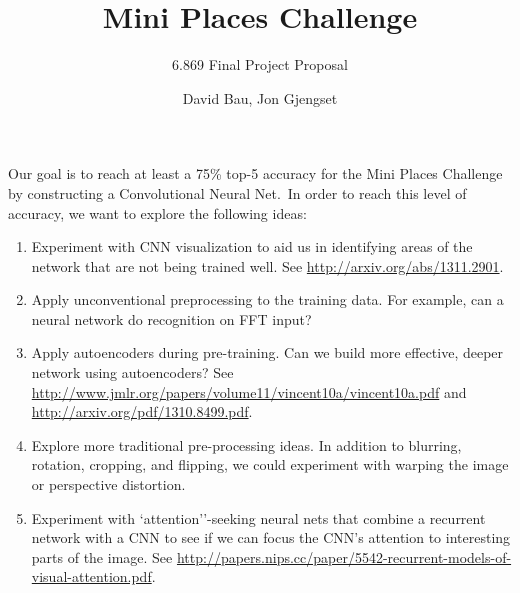 \documentclass[letterpaper]{scrartcl}
\title{Mini Places Challenge}
\subtitle{6.869 Final Project Proposal}
\author{David Bau, Jon Gjengset}
\begin{document}
\maketitle

Our goal is to reach at least a 75\% top-5 accuracy for the Mini Places
Challenge by constructing a Convolutional Neural Net.\ In order to reach
this level of accuracy, we want to explore the following ideas:
\begin{enumerate}
\item Experiment with CNN visualization to aid us in identifying
	areas of the network that are not being trained well. See
	\url{http://arxiv.org/abs/1311.2901}.
\item Apply unconventional preprocessing to the training data. For
	example, can a neural network do recognition on FFT input?
\item Apply autoencoders during pre-training. Can we build more
	effective, deeper network using autoencoders? See
	\url{http://www.jmlr.org/papers/volume11/vincent10a/vincent10a.pdf}
	and \url{http://arxiv.org/pdf/1310.8499.pdf}.
\item Explore more traditional pre-processing ideas. In addition to
	blurring, rotation, cropping, and flipping, we could experiment
	with warping the image or perspective distortion.
\item Experiment with `attention''-seeking neural nets that combine a
	recurrent network with a CNN to see if we can focus the CNN's
	attention to interesting parts of the image. See
	\url{http://papers.nips.cc/paper/5542-recurrent-models-of-visual-attention.pdf}.
\end{enumerate}
\end{document}
